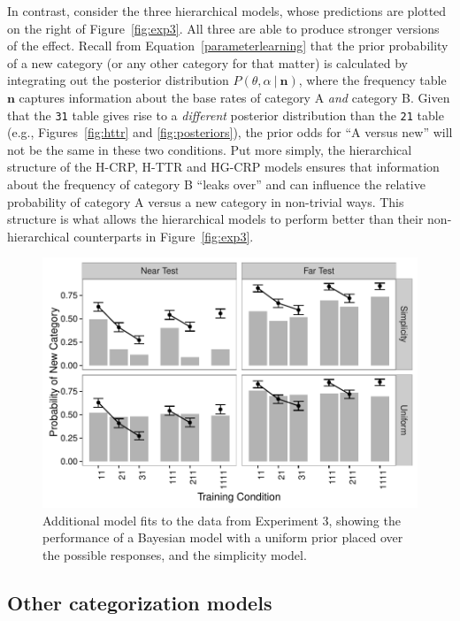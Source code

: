 \documentclass[doc]{apa6}
\newcommand{\given}{\ | \ }
\newcommand{\dist}[1]{\texttt{#1}}
\begin{document}
In contrast, consider the three hierarchical models, whose predictions are plotted on the right of Figure~\ref{fig:exp3}. All three are able to produce stronger versions of the effect. Recall from Equation~\ref{parameterlearning} that the prior probability of a new category (or any other category for that matter) is calculated by integrating out the posterior distribution $P(\theta,\alpha \given \bm{n})$, where the frequency table $\bm{n}$ captures information about the base rates of category A {\it and} category B. Given that the \dist{31} table gives rise to a {\it different} posterior distribution than the \dist{21} table (e.g., Figures~\ref{fig:httr} and \ref{fig:posteriors}), the prior odds for ``A versus new'' will not be the same in these two conditions. Put more simply, the hierarchical structure of the H-CRP, H-TTR and HG-CRP models ensures that information about the frequency of category B ``leaks over'' and can influence the relative probability of category A versus a new category in non-trivial ways. This structure is what allows the hierarchical models to perform better than their non-hierarchical counterparts in Figure~\ref{fig:exp3}.

\begin{figure}[t]
\begin{center}
\includegraphics[scale=.6]{fit3_other.pdf}
\caption{Additional model fits to the data from Experiment 3, showing the performance of a Bayesian model with a uniform prior placed over the possible responses, and the simplicity model. }
\label{fig:exp3other}
\end{center}
\end{figure}

\subsection{Other categorization models}
\end{document}
